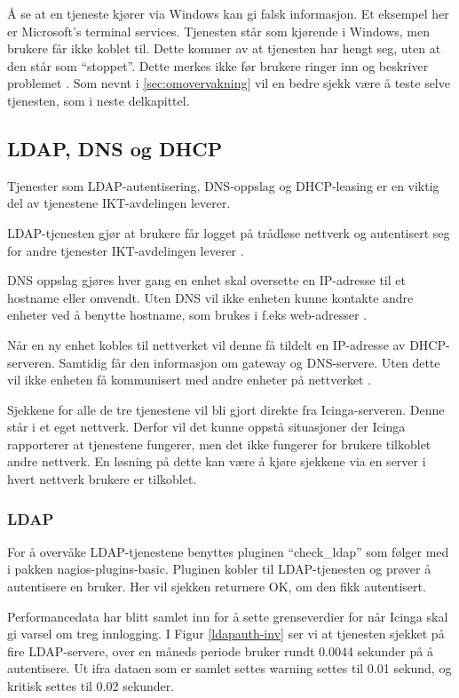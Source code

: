 Å se at en tjeneste kjører via Windows kan gi falsk informasjon. Et eksempel her er Microsoft's terminal services. Tjenesten står som kjørende i Windows, men brukere får ikke koblet til. Dette kommer av at tjenesten har hengt seg, uten at den står som “stoppet”. Dette merkes ikke før brukere ringer inn og beskriver problemet \cite{serviceproblem}. Som nevnt i \ref{sec:omovervakning} vil en bedre sjekk være å teste selve tjenesten, som i neste delkapittel.

\subsection{LDAP, DNS og DHCP}

Tjenester som LDAP-autentisering, DNS-oppslag og DHCP-leasing er en viktig del av tjenestene IKT-avdelingen leverer.

LDAP-tjenesten gjør at brukere får logget på trådløse nettverk og autentisert seg for andre tjenester IKT-avdelingen leverer \cite{ldap}.

DNS oppslag gjøres hver gang en enhet skal oversette en IP-adresse til et hostname eller omvendt. Uten DNS vil ikke enheten kunne kontakte andre enheter ved å benytte hostname, som brukes i f.eks web-adresser \cite{dns}. 

Når en ny enhet kobles til nettverket vil denne få tildelt en IP-adresse av DHCP-serveren. Samtidig får den informasjon om gateway og DNS-servere. Uten dette vil ikke enheten få kommunisert med andre enheter på nettverket \cite{dhcp}.

Sjekkene for alle de tre tjenestene vil bli gjort direkte fra Icinga-serveren. Denne står i et eget nettverk. Derfor vil det kunne oppstå situasjoner der Icinga rapporterer at tjenestene fungerer, men det ikke fungerer for brukere tilkoblet andre nettverk. En løsning på dette kan være å kjøre sjekkene via en server i hvert nettverk brukere er tilkoblet.


\subsubsection*{LDAP}

For å overvåke LDAP-tjenestene benyttes pluginen “check\_ldap” som følger med i pakken nagios-plugins-basic. Pluginen kobler til LDAP-tjenesten og prøver å autentisere en bruker. Her vil sjekken returnere OK, om den fikk autentisert. 

Performancedata har blitt samlet inn for å sette grenseverdier for når Icinga skal gi varsel om treg innlogging. I Figur \ref{ldapauth-inv} ser vi at tjenesten sjekket på fire LDAP-servere, over en måneds periode bruker rundt 0.0044 sekunder på å autentisere. Ut ifra dataen som er samlet settes warning settes til 0.01 sekund, og kritisk settes til 0.02 sekunder.

